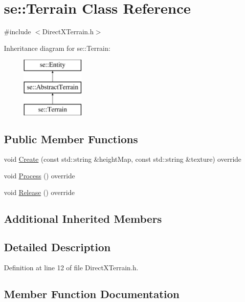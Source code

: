 \hypertarget{classse_1_1_terrain}{}\section{se\+:\+:Terrain Class Reference}
\label{classse_1_1_terrain}


{\ttfamily \#include $<$Direct\+X\+Terrain.\+h$>$}

Inheritance diagram for se\+:\+:Terrain\+:\begin{figure}[H]
\begin{center}
\leavevmode
\includegraphics[height=3.000000cm]{classse_1_1_terrain}
\end{center}
\end{figure}
\subsection*{Public Member Functions}
\begin{DoxyCompactItemize}
\item 
void \mbox{\hyperlink{classse_1_1_terrain_aa4faf6049af59a776a2464175e62ff08}{Create}} (const std\+::string \&height\+Map, const std\+::string \&texture) override
\item 
void \mbox{\hyperlink{classse_1_1_terrain_aa4eeb1886f46d2f33e1633b6f7c7345c}{Process}} () override
\item 
void \mbox{\hyperlink{classse_1_1_terrain_a61004e3426795d93190fe8d1f4159759}{Release}} () override
\end{DoxyCompactItemize}
\subsection*{Additional Inherited Members}


\subsection{Detailed Description}


Definition at line 12 of file Direct\+X\+Terrain.\+h.



\subsection{Member Function Documentation}
\mbox{\label{classse_1_1_terrain_aa4faf6049af59a776a2464175e62ff08}} 
